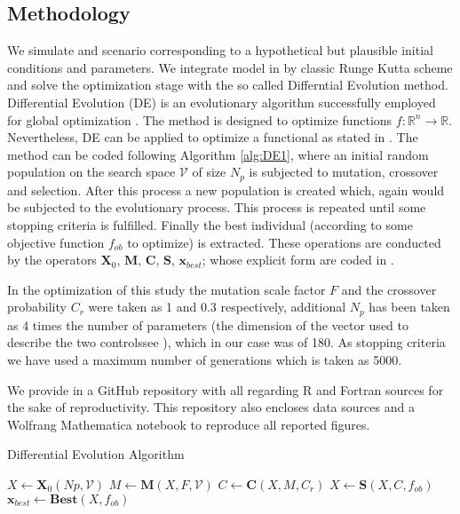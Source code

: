 \subsection{Methodology}
    We simulate and scenario corresponding to a hypothetical but plausible
initial conditions and parameters. We integrate model in
 by classic Runge Kutta scheme and solve the
optimization stage with the so called Differntial Evolution method.
Differential Evolution (DE) \cite{Storn1997} is an evolutionary
algorithm successfully employed for global optimization
\cite{Bilal2020}. The method is designed to optimize functions
$f:\mathbb{R}^n \to \mathbb{R}$. Nevertheless, DE can be applied to
optimize a functional as stated in \cite{CANTUNetAl}. The method can be
coded following Algorithm \ref{alg:DE1}, where an initial random
population on the search space $\mathcal{V}$ of size $N_p$ is subjected
to mutation, crossover and selection. After this process a new
population is created which, again would be subjected to the
evolutionary process. This process is repeated until some stopping
criteria is fulfilled. Finally the best individual (according to some
objective function $f_{ob}$ to optimize) is extracted. These operations
are conducted by the operators $\mathbf{X}_0$, $\mathbf{M}$,
$\mathbf{C}$, $\mathbf{S}$, $\mathbf{x}_{best}$;  whose explicit form
are coded in \cite{Penunuri2016}.

In the optimization of this study
the mutation scale factor $F$ and the crossover probability $C_r$ were
taken as 1 and 0.3 respectively, additional $N_p$ has been taken as 4
times the number of parameters (the dimension of the vector used to
describe the two controls\textemdash see \cite{CANTUNetAl}), which in our case was
of 180. As stopping criteria we have used a maximum number of
generations which is taken as \num{5000}.

    We provide in \cite{gitHub_b} a GitHub repository with all regarding R
and Fortran sources for the sake of reproductivity. This repository also
encloses data sources and a Wolfrang Mathematica notebook to reproduce all
reported figures.


\begin{algorithm}[htb]
  \caption{Differential Evolution Algorithm}
  \label{alg:DE1}
  \begin{algorithmic}
    \State $X \leftarrow \mathbf{X}_0(Np,\mathcal{V})$
    \State $M \leftarrow \mathbf{M}(X,F,\mathcal{V})$
    \State $C \leftarrow \mathbf{C}(X,M,C_r)$
    \State $X \leftarrow \mathbf{S}(X,C,f_{ob})$
    \EndWhile
    \State $\mathbf{x}_{best} \leftarrow \mathbf{Best}(X, f_{ob})$
  \end{algorithmic}
\end{algorithm}

